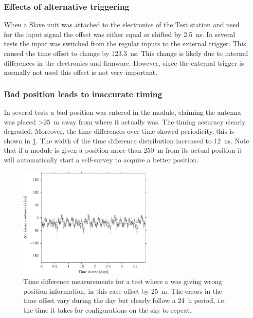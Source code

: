 \subsubsection{Effects of alternative triggering}

When a Slave unit was attached to the electronics of the Test station and used for the input signal the offset was either equal or shifted by \SI{2.5}{\ns}. In several tests the input was switched from the regular \pmt inputs to the external trigger. This caused the time offset to change by \SI{123.3}{\ns}. This change is likely due to internal differences in the electronics and firmware. However, since the external trigger is normally not used this offset is not very important.

\subsubsection{Bad position leads to inaccurate timing}

In several tests a bad position was entered in the \gps module, claiming the \gps antenna was placed \SI{>25}{\meter} away from where it actually was. The timing accuracy clearly degraded. Moreover, the time differences over time showed periodicity, this is shown in \cref{fig:tt_delta_time_022}. The width of the time difference distribution increased to \SI{12}{\ns}. Note that if a \gps module is given a position more than \SI{250}{\meter} from its actual position it will automatically start a self-survey to acquire a better position.

\begin{figure}
    \centering
    \includegraphics[width=0.6\textwidth]
                    {plots/cluster/tt_delta_time_022}
    \caption{Time difference measurements for a test where a \gps was giving wrong position information, in this case offset by \SI{25}{\meter}. The errors in the time offset vary during the day but clearly follow a \SI{24}{\hour} period, i.e. the time it takes for \gps configurations on the sky to repeat.}
    \label{fig:tt_delta_time_022}
\end{figure}


